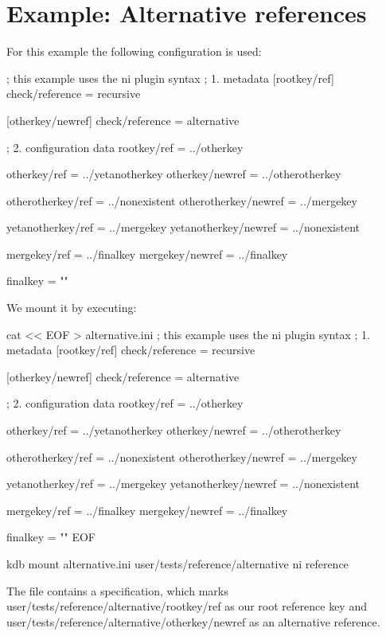 \hypertarget{md_src_plugins_reference_examples_alternative_README_src_plugins_reference_examples_alternative_README_md}{}\section{Example\+: Alternative references}\label{md_src_plugins_reference_examples_alternative_README_src_plugins_reference_examples_alternative_README_md}
For this example the following configuration is used\+:


\begin{DoxyCode}
; this example uses the ni plugin syntax
; 1. metadata
[rootkey/ref]
check/reference = recursive

[otherkey/newref]
check/reference = alternative

; 2. configuration data
rootkey/ref = ../otherkey

otherkey/ref = ../yetanotherkey
otherkey/newref = ../otherotherkey

otherotherkey/ref = ../nonexistent
otherotherkey/newref = ../mergekey

yetanotherkey/ref = ../mergekey
yetanotherkey/newref = ../nonexistent

mergekey/ref = ../finalkey
mergekey/newref = ../finalkey

finalkey = ""
\end{DoxyCode}


We mount it by executing\+:


\begin{DoxyCode}
cat << EOF > alternative.ini
; this example uses the ni plugin syntax
; 1. metadata
[rootkey/ref]
check/reference = recursive

[otherkey/newref]
check/reference = alternative

; 2. configuration data
rootkey/ref = ../otherkey

otherkey/ref = ../yetanotherkey
otherkey/newref = ../otherotherkey

otherotherkey/ref = ../nonexistent
otherotherkey/newref = ../mergekey

yetanotherkey/ref = ../mergekey
yetanotherkey/newref = ../nonexistent

mergekey/ref = ../finalkey
mergekey/newref = ../finalkey

finalkey = ""
EOF

kdb mount alternative.ini user/tests/reference/alternative ni reference
\end{DoxyCode}


The file contains a specification, which marks {\ttfamily user/tests/reference/alternative/rootkey/ref} as our root reference key and {\ttfamily user/tests/reference/alternative/otherkey/newref} as an alternative reference.

